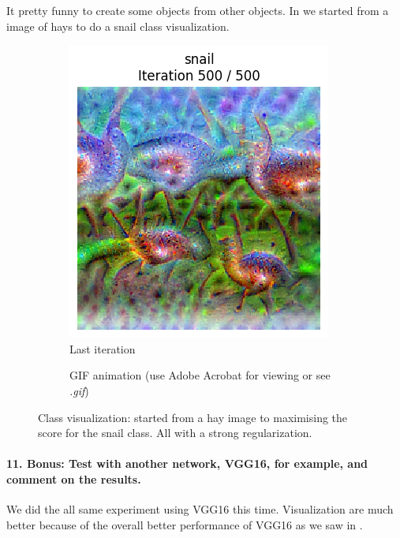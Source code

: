 It pretty funny to create some objects from other objects. In  we started from a image of hays to do a snail class visualization.
\begin{figure}[H]
    \centering
    \begin{subfigure}{.5\textwidth}
        \centering
        \includegraphics[width=.7\linewidth]{figs/2b/SqueezeNet/SqueezeNet_snail_animated_init_img_reg++_last_frame.png}
        \caption{Last iteration}
        \label{fig:class_viz_start_image_dif:png}
    \end{subfigure}%
    \begin{subfigure}{.5\textwidth}
        \centering
        \caption{GIF animation (use Adobe Acrobat for viewing or see \textit{.gif})}
        \label{fig:class_viz_start_image_dif:vid}
    \end{subfigure}

    \caption{Class visualization: started from a hay image to maximising the score for the snail class. All with a strong regularization.}
    \label{fig:class_viz_start_image_dif}
\end{figure}

\paragraph*{11. \textbf{Bonus:} Test with another network, VGG16, for example, and comment on the results.}
We did the all same experiment using VGG16 this time. Visualization are much better because of the overall better performance of VGG16 as we saw in \Cref{}. %


